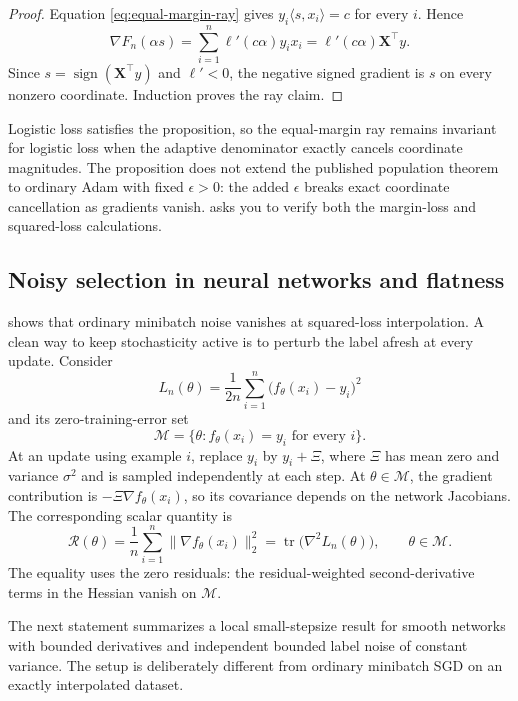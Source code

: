 \documentclass[11pt,twoside]{article}
\newcommand{\sign}{\operatorname{sign}}
\theoremstyle{definition}
\theoremstyle{remark}
\begin{document}
\begin{proof}
Equation \cref{eq:equal-margin-ray} gives
$y_i\langle s,x_i\rangle=c$ for every $i$. Hence
\[
 \nabla F_n(\alpha s)
 =\sum_{i=1}^n\ell'(c\alpha)y_ix_i
 =\ell'(c\alpha)\mathbf X^\top y.
\]
Since $s=\sign(\mathbf X^\top y)$ and $\ell'<0$, the negative signed
gradient is $s$ on every nonzero coordinate. Induction proves the ray claim.
\end{proof}

Logistic loss satisfies the proposition, so the equal-margin ray remains
invariant for logistic loss when the adaptive denominator exactly cancels
coordinate magnitudes. The proposition does not extend the published
population theorem to ordinary Adam with fixed $\epsilon>0$: the added
$\epsilon$ breaks exact
coordinate cancellation as gradients vanish. 
asks you to verify both the margin-loss and squared-loss calculations.

\subsection{Noisy selection in neural networks and flatness}
\label{sec:noise-flatness}

 shows that ordinary minibatch noise
vanishes at squared-loss interpolation. A clean way to keep stochasticity
active is to perturb the label afresh at every update. Consider
\[
 L_n(\theta)=\frac1{2n}\sum_{i=1}^n
 \bigl(f_\theta(x_i)-y_i\bigr)^2
\]
and its zero-training-error set
\[
 \mathcal M=\{\theta:f_\theta(x_i)=y_i\text{ for every }i\}.
\]
At an update using example $i$, replace $y_i$ by $y_i+\Xi$, where $\Xi$ has
mean zero and variance $\sigma^2$ and is sampled independently at each step.
At $\theta\in\mathcal M$, the gradient contribution is
$-\Xi\nabla f_\theta(x_i)$, so its covariance depends on the network
Jacobians. The corresponding scalar quantity is
\begin{equation}
 \mathcal R(\theta)
 =\frac1n\sum_{i=1}^n\|\nabla f_\theta(x_i)\|_2^2
 =\operatorname{tr}\bigl(\nabla^2L_n(\theta)\bigr),
 \qquad \theta\in\mathcal M.
 \label{eq:label-noise-regularizer}
\end{equation}
The equality uses the zero residuals: the residual-weighted second-derivative
terms in the Hessian vanish on $\mathcal M$.

The next statement summarizes a local small-stepsize result for smooth
networks with bounded derivatives and independent bounded label noise of
constant variance. The setup is deliberately different from ordinary
minibatch SGD on an exactly interpolated dataset.
\end{document}
